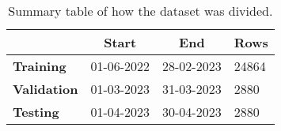 \begin{table}[H]
	\begin{center}
		\begin{tabular}[c]{l|l|l|l}
			\multicolumn{1}{c|}{}               &
			\multicolumn{1}{c|}{\textbf{Start}} &
			\multicolumn{1}{c|}{\textbf{End}}   &
			\multicolumn{1}{c}{\textbf{Rows}}                                     \\
			\hline

			\textbf{Training}                   & 01-06-2022 & 28-02-2023 & 24864 \\
			\textbf{Validation}                 & 01-03-2023 & 31-03-2023 & 2880  \\
			\textbf{Testing}                    & 01-04-2023 & 30-04-2023 & 2880
		\end{tabular}
	\end{center}
	\caption{Summary table of how the dataset was divided.}\label{tab:dfsplit}
\end{table}
